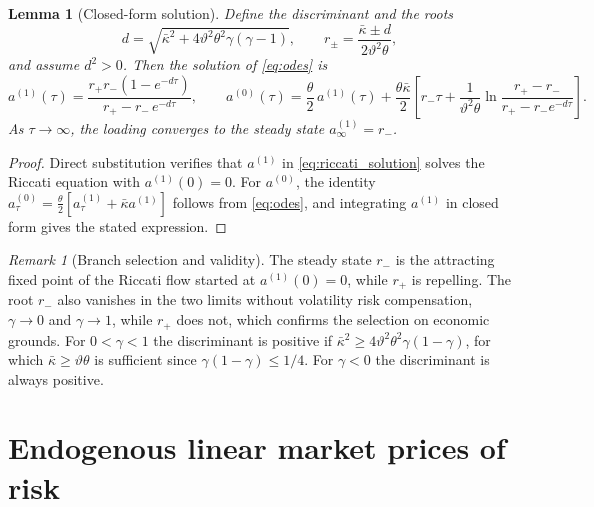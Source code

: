 \documentclass[11pt]{article}
\newtheorem{lemma}{Lemma}
\theoremstyle{remark}
\newtheorem{remark}{Remark}
\begin{document}
\begin{lemma}[Closed-form solution]\label{lem:riccati}
Define the discriminant and the roots
\begin{equation}\label{eq:roots}
d= \sqrt{ \bar\kappa^{2}+4\vartheta^{2} \theta^{2} \gamma (\gamma-1) }, \qquad
r_{\pm} = \frac{\bar\kappa \pm d}{2\vartheta^{2} \theta},
\end{equation}
and assume $d^{2}>0$. Then the solution of \eqref{eq:odes} is
\begin{equation}\label{eq:riccati_solution}
a^{(1)}(\tau) = \frac{ r_{+} r_{-} \left(1 - e^{-d \tau}\right)}{r_{+} - r_{-}\, e^{-d \tau}},
\qquad
a^{(0)}(\tau) = \frac{\theta}{2}\, a^{(1)}(\tau) + \frac{\theta \bar\kappa}{2} \left[ r_{-}\tau + \frac{1}{\vartheta^{2}\theta} \ln \frac{r_{+}-r_{-}}{r_{+}-r_{-}e^{-d\tau}} \right].
\end{equation}
As $\tau \to \infty$, the loading converges to the steady state $a^{(1)}_{\infty} = r_{-}$.
\end{lemma}
\begin{proof}
Direct substitution verifies that $a^{(1)}$ in \eqref{eq:riccati_solution} solves the Riccati equation with $a^{(1)}(0)=0$. For $a^{(0)}$, the identity $a^{(0)}_{\tau} = \frac{\theta}{2}\left[ a^{(1)}_{\tau} + \bar\kappa a^{(1)} \right]$ follows from \eqref{eq:odes}, and integrating $a^{(1)}$ in closed form gives the stated expression.
\end{proof}

\begin{remark}[Branch selection and validity]\label{rem:branch}
The steady state $r_{-}$ is the attracting fixed point of the Riccati flow started at $a^{(1)}(0)=0$, while $r_{+}$ is repelling. The root $r_{-}$ also vanishes in the two limits without volatility risk compensation, $\gamma \to 0$ and $\gamma \to 1$, while $r_{+}$ does not, which confirms the selection on economic grounds. For $0<\gamma<1$ the discriminant is positive if $\bar\kappa^{2} \geq 4\vartheta^{2}\theta^{2}\gamma(1-\gamma)$, for which $\bar\kappa \geq \vartheta\theta$ is sufficient since $\gamma(1-\gamma) \leq 1/4$. For $\gamma<0$ the discriminant is always positive.
\end{remark}

\section{Endogenous linear market prices of risk}\label{sec:linearity}
\end{document}
